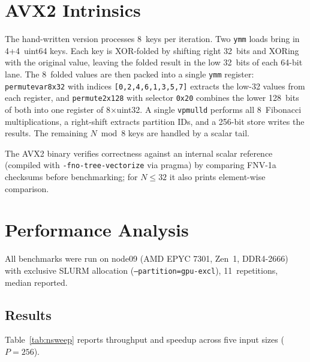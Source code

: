 \documentclass[10pt,a4paper,twocolumn]{article}
\begin{document}
\section{AVX2 Intrinsics}

The hand-written version processes 8~keys per iteration. Two \texttt{ymm} loads bring in 4+4~uint64 keys. Each key is XOR-folded by shifting right 32~bits and XORing with the original value, leaving the folded result in the low 32~bits of each 64-bit lane. The 8~folded values are then packed into a single \texttt{ymm} register: \texttt{permutevar8x32} with indices \texttt{[0,2,4,6,1,3,5,7]} extracts the low-32 values from each register, and \texttt{permute2x128} with selector \texttt{0x20} combines the lower 128~bits of both into one register of 8$\times$uint32. A single \texttt{vpmulld} performs all 8~Fibonacci multiplications, a right-shift extracts partition IDs, and a 256-bit store writes the results. The remaining $N \bmod 8$ keys are handled by a scalar tail.

The AVX2 binary verifies correctness against an internal scalar reference (compiled with \texttt{-fno-tree-vectorize} via pragma) by comparing FNV-1a checksums before benchmarking; for $N\!\leq\!32$ it also prints element-wise comparison.

\section{Performance Analysis}
\label{sec:analysis}

All benchmarks were run on node09 (AMD EPYC 7301, Zen~1, DDR4-2666) with exclusive SLURM allocation (\texttt{--partition=gpu-excl}), 11~repetitions, median reported.

\subsection{Results}

Table~\ref{tab:nsweep} reports throughput and speedup across five input sizes ($P\!=\!256$).
\end{document}
